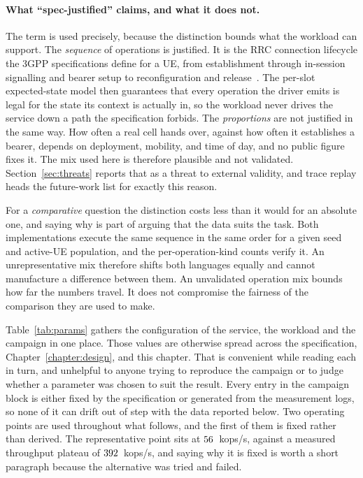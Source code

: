 \documentclass[english,oneside,a4paper,censored,csm,software-track-2020]{HYthesisML}
\begin{document}
\paragraph{What ``spec-justified'' claims, and what it does not.}
The term is used precisely, because the distinction bounds what the workload can support. The
\emph{sequence} of operations is justified. It is the RRC connection lifecycle the 3GPP
specifications define for a UE, from establishment through in-session signalling and bearer setup
to reconfiguration and release~\cite{3gpp38401,3gpp38331}. The per-slot expected-state model then
guarantees that every operation the driver emits is legal for the state its context is actually
in, so the workload never drives the service down a path the specification forbids. The
\emph{proportions} are not justified in the same way. How often a real cell hands over, against
how often it establishes a bearer, depends on deployment, mobility, and time of day, and no
public figure fixes it. The mix used here is therefore plausible and not validated.
Section~\ref{sec:threats} reports that as a threat to external validity, and trace replay heads
the future-work list for exactly this reason.

For a \emph{comparative} question the distinction costs less than it would for an absolute one,
and saying why is part of arguing that the data suits the task. Both implementations execute the
same sequence in the same order for a given seed and active-UE population, and the
per-operation-kind counts verify it. An unrepresentative mix therefore shifts both languages
equally and cannot manufacture a difference between them. An unvalidated operation mix bounds how
far the numbers travel. It does not compromise the fairness of the comparison they are used to make.

Table~\ref{tab:params} gathers the configuration of the service, the workload and the campaign in
one place. Those values are otherwise spread across the specification,
Chapter~\ref{chapter:design}, and this chapter. That is convenient while reading each in turn, and
unhelpful to anyone trying to reproduce the campaign or to judge whether a parameter was chosen to
suit the result. Every entry in the campaign block is either fixed by the specification or
generated from the measurement logs, so none of it can drift out of step with the data reported
below. Two operating points are used throughout what follows, and the first of them is fixed
rather than derived. The representative point sits at $56$~kops/s, against a measured
throughput plateau of $392$~kops/s, and saying why it is fixed is worth a short paragraph
because the alternative was tried and failed.
\end{document}
